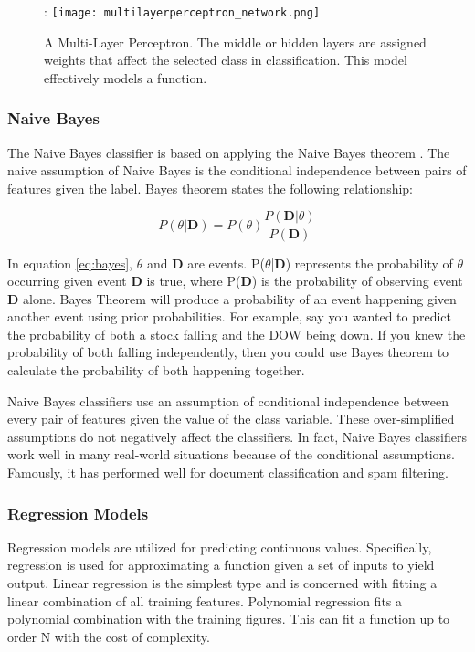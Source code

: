 \begin{figure}[htp]:
    \centering
    \texttt{[image: multilayerperceptron\_network.png]}
    \caption{A Multi-Layer Perceptron.
    The middle or hidden layers are assigned weights that affect the selected class in classification.
    This model effectively models a function.}
    \label{}
\end{figure}



\subsubsection{Naive Bayes}
The Naive Bayes classifier is based on applying the Naive Bayes theorem \cite{zhang2004optimality}.
The naive assumption of Naive Bayes is the conditional independence between pairs of features given the label.
Bayes theorem states the following relationship:

\begin{equation}
    \label{eq:bayes}
    P(\theta|\textbf{D}) = P(\theta) \frac{P(\textbf{D} |\theta)}{P(\textbf{D})}
\end{equation}

In equation \ref{eq:bayes}, $\theta$ and \textbf{D} are events. 
P($\theta$|\textbf{D}) represents the probability of $\theta$ occurring given event \textbf{D} is true, where P(\textbf{D}) is the probability of observing event \textbf{D} alone.
Bayes Theorem will produce a probability of an event happening given another event using prior probabilities.
For example, say you wanted to predict the probability of both a stock falling and the DOW being down.
If you knew the probability of both falling independently, then you could use Bayes theorem to calculate the probability of both happening together.

Naive Bayes classifiers use an assumption of conditional independence between every pair of features given the value of the class variable. 
These over-simplified assumptions do not negatively affect the classifiers.
In fact, Naive Bayes classifiers work well in many real-world situations because of the conditional assumptions\cite{zhang2004optimality}.
Famously, it has performed well for document classification and spam filtering. 

\subsubsection{Regression Models}
Regression models are utilized for predicting continuous values.
Specifically, regression is used for approximating a function given a set of inputs to yield output.
Linear regression is the simplest type and is concerned with fitting a linear combination of all training features.
Polynomial regression fits a polynomial combination with the training figures.
This can fit a function up to order N with the cost of complexity. \\

